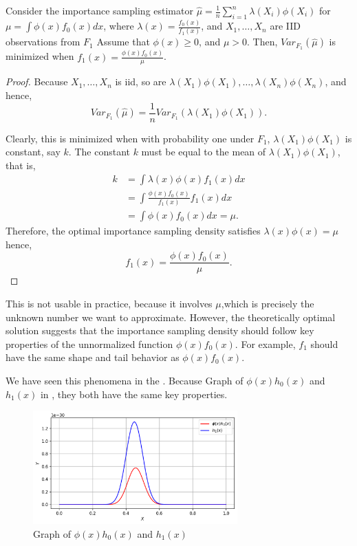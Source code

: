 \begin{theorem}
	Consider the importance sampling estimator $\hat{\mu} = \frac{1}{n}\sum_{i=1}^{n} \lambda(X_i)\phi(X_i) $ for $\mu=\int \phi(x)f_0(x)dx $, where
	$\lambda(x) =\frac{f_0(x)}{f_1(x)}$, and $X_1,\ldots,X_n$ are IID observations from $F_1$
	Assume that $\phi(x)\ge0$, and $\mu>0$. Then, $Var_{F_1}(\hat{\mu})$ is
	minimized when $f_1(x)=\frac{\phi(x)f_0(x)}{\mu}$.
\end{theorem}
\begin{proof}
	Because $X_1,\ldots,X_n$ is iid, so are $\lambda(X_1)\phi(X_1),\ldots,\lambda(X_n)\phi(X_n)$, and hence,
	\[
		Var_{F_1}(\hat{\mu}) = \frac{1}{n} Var_{F_1}(\lambda(X_1)\phi(X_1))
		.
	\]

	Clearly, this is minimized when with probability one under $F_1$, $\lambda(X_1)\phi(X_1)$
	is constant, say $k$. The constant $k$ must be equal to the mean of $\lambda(X_1)\phi(X_1)$, that is,
	\begin{align*}
		k & = \int \lambda(x)\phi(x)f_1(x)dx              \\
		  & = \int \frac{\phi(x)f_0(x)}{f_1(x)} f_1(x) dx \\
		  & = \int \phi(x)f_0(x)dx = \mu.
	\end{align*}
	Therefore, the optimal importance sampling density satisfies $\lambda(x)\phi(x) = \mu$
	hence,
	\[
		f_1(x) = \frac{\phi(x)f_0(x)}{\mu}.
	\]
\end{proof}
This is not usable in practice, because it involves $\mu$,which is precisely the unknown number we want to approximate.
However, the theoretically optimal solution
suggests that the importance sampling density should follow key properties of the
unnormalized function $\phi(x)f_0(x)$.
For example, $f_1$ should have the same shape and tail behavior as $\phi(x)f_0(x)$.

We have seen this phenomena in the .
Because Graph of $\phi(x)h_0(x)$ and $h_1(x)$ in , they both have the same key properties.   
\begin{figure}[H]
    \centering
    \includegraphics[width=0.7\textwidth]{images/importance-sampling/ex2plot_hx.png}
    \caption{Graph of $\phi(x)h_0(x)$ and $h_1(x)$}
    \label{fig:ch4ex2plothx}
\end{figure}
